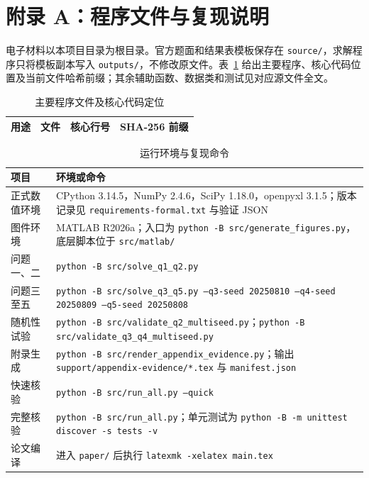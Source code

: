 \documentclass[UTF8,a4paper,12pt,fontset=windows]{ctexart}
\newcommand{\thead}[1]{{\bfseries\boldmath #1}}
\begin{document}
\section*{附录 A：程序文件与复现说明}

电子材料以本项目目录为根目录。官方题面和结果表模板保存在 \texttt{source/}，求解程序只将模板副本写入 \texttt{outputs/}，不修改原文件。表~\ref{tab:appendix-file-index} 给出主要程序、核心代码位置及当前文件哈希前缀；其余辅助函数、数据类和测试见对应源文件全文。

\begin{table}[H]
\centering
\caption{主要程序文件及核心代码定位}
\label{tab:appendix-file-index}
\footnotesize
\begin{tabular}{p{2.9cm}p{6.0cm}p{3.0cm}p{2.2cm}}
\toprule
\thead{用途} & \thead{文件} & \thead{核心行号} & \thead{SHA-256 前缀}\\
\midrule

\end{tabular}
\end{table}

\begin{table}[H]
\centering
\caption{运行环境与复现命令}
\label{tab:appendix-commands}
\footnotesize
\begin{tabularx}{\textwidth}{p{3.2cm}Y}
\toprule
\thead{项目} & \thead{环境或命令}\\
\midrule
正式数值环境 & CPython 3.14.5，NumPy 2.4.6，SciPy 1.18.0，openpyxl 3.1.5；版本记录见 \texttt{requirements-formal.txt} 与验证 JSON\\
图件环境 & MATLAB R2026a；入口为 \texttt{python -B src/generate\_figures.py}，底层脚本位于 \texttt{src/matlab/}\\
问题一、二 & \texttt{python -B src/solve\_q1\_q2.py}\\
问题三至五 & \texttt{python -B src/solve\_q3\_q5.py --q3-seed 20250810 --q4-seed 20250809 --q5-seed 20250808}\\
随机性试验 & \texttt{python -B src/validate\_q2\_multiseed.py}；\texttt{python -B src/validate\_q3\_q4\_multiseed.py}\\
附录生成 & \texttt{python -B src/render\_appendix\_evidence.py}；输出 \texttt{support/appendix-evidence/*.tex} 与 \texttt{manifest.json}\\
快速核验 & \texttt{python -B src/run\_all.py --quick}\\
完整核验 & \texttt{python -B src/run\_all.py}；单元测试为 \texttt{python -B -m unittest discover -s tests -v}\\
论文编译 & 进入 \texttt{paper/} 后执行 \texttt{latexmk -xelatex main.tex}\\
\bottomrule
\end{tabularx}
\end{table}
\end{document}
